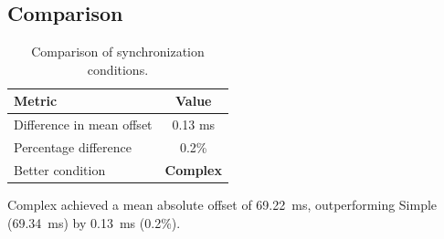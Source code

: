 \subsection*{Comparison}

\begin{table}[h!]
\centering
\begin{tabular}{|l|c|}
\hline
Metric & Value \\
\hline
Difference in mean offset & 0.13 ms \\
Percentage difference & 0.2\% \\
Better condition & \textbf{Complex} \\
\hline
\end{tabular}
\caption{Comparison of synchronization conditions.}
\label{tab:sync_comparison}
\end{table}

Complex achieved a mean absolute offset of 69.22~ms, outperforming Simple (69.34~ms) by 0.13~ms (0.2\%).
